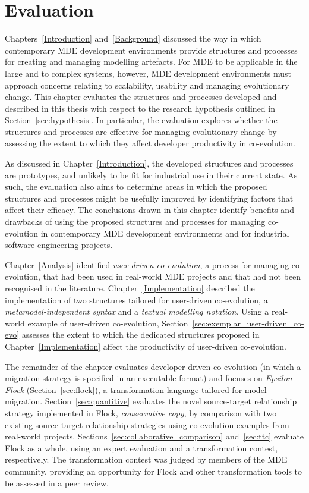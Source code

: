
\chapter{Evaluation}
\label{Evaluation}
Chapters~\ref{Introduction} and~\ref{Background} discussed the way in which contemporary MDE development environments provide structures and processes for creating and managing modelling artefacts. For MDE to be applicable in the large and to complex systems, however, MDE development environments must approach concerns relating to scalability, usability and managing evolutionary change. This chapter evaluates the structures and processes developed and described in this thesis with respect to the research hypothesis outlined in Section~\ref{sec:hypothesis}. In particular, the evaluation explores whether the structures and processes are effective for managing evolutionary change by assessing the extent to which they affect developer productivity in co-evolution.

As discussed in Chapter~\ref{Introduction}, the developed structures and processes are prototypes, and unlikely to be fit for industrial use in their current state. As such, the evaluation also aims to determine areas in which the proposed structures and processes might be usefully improved by identifying factors that affect their efficacy. The conclusions drawn in this chapter identify benefits and drawbacks of using the proposed structures and processes for managing co-evolution in contemporary MDE development environments and for industrial software-engineering projects.

Chapter~\ref{Analysis} identified \emph{user-driven co-evolution}, a process for managing co-evolution, that had been used in real-world MDE projects and that had not been recognised in the literature. Chapter~\ref{Implementation} described the implementation of two structures tailored for user-driven co-evolution, a \emph{metamodel-independent syntax} and a \emph{textual modelling notation}. Using a real-world example of user-driven co-evolution, Section~\ref{sec:exemplar_user-driven_co-evo} assesses the extent to which the dedicated structures proposed in Chapter~\ref{Implementation} affect the productivity of user-driven co-evolution.

The remainder of the chapter evaluates developer-driven co-evolution (in which a migration strategy is specified in an executable format) and focuses on \emph{Epsilon Flock} (Section~\ref{sec:flock}), a transformation language tailored for model migration. Section~\ref{sec:quantitive} evaluates the novel source-target relationship strategy implemented in Flock, \emph{conservative copy}, by comparison with two existing source-target relationship strategies using co-evolution examples from real-world projects. Sections~\ref{sec:collaborative_comparison} and~\ref{sec:ttc} evaluate Flock as a whole, using an expert evaluation and a transformation contest, respectively. The transformation contest was judged by members of the MDE community, providing an opportunity for Flock and other transformation tools to be assessed in a peer review.


